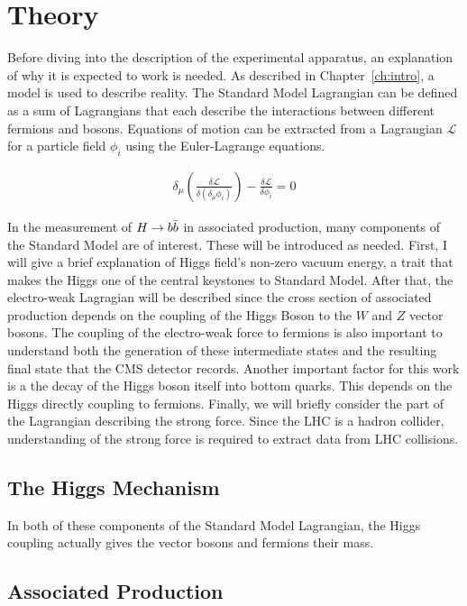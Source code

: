 \chapter{Theory} \label{ch:theory}

Before diving into the description of the experimental apparatus,
an explanation of why it is expected to work is needed.
As described in Chapter~\ref{ch:intro}, a model is used to describe reality.
The Standard Model Lagrangian can be defined as a sum of Lagrangians that each describe
the interactions between different fermions and bosons.
Equations of motion can be extracted from a Lagrangian $\mathcal{L}$
for a particle field $\phi_i$ using the Euler-Lagrange equations.

\begin{gather}
  \delta_\mu\left(\frac{\delta \mathcal{L}}{\delta(\delta_\mu \phi_i)}\right) -
  \frac{\delta \mathcal{L}}{\delta \phi_i} = 0
\end{gather}

In the measurement of $H\rightarrow b\bar{b}$ in associated production,
many components of the Standard Model are of interest.
These will be introduced as needed.
First, I will give a brief explanation of Higgs field's non-zero vacuum energy,
a trait that makes the Higgs one of the central keystones to Standard Model.
After that, the electro-weak Lagragian will be described since
the cross section of associated production depends on
the coupling of the Higgs Boson to the $W$ and $Z$ vector bosons.
The coupling of the electro-weak force to fermions is also important to
understand both the generation of these intermediate states and
the resulting final state that the CMS detector records.
Another important factor for this work is a the decay of the Higgs boson itself into bottom quarks.
This depends on the Higgs directly coupling to fermions.
Finally, we will briefly consider the part of the Lagrangian describing the strong force.
Since the LHC is a hadron collider,
understanding of the strong force is required to extract data from LHC collisions.

\section{The Higgs Mechanism}

In both of these components of the Standard Model Lagrangian,
the Higgs coupling actually gives the vector bosons and fermions their mass.

\section{Associated Production}

